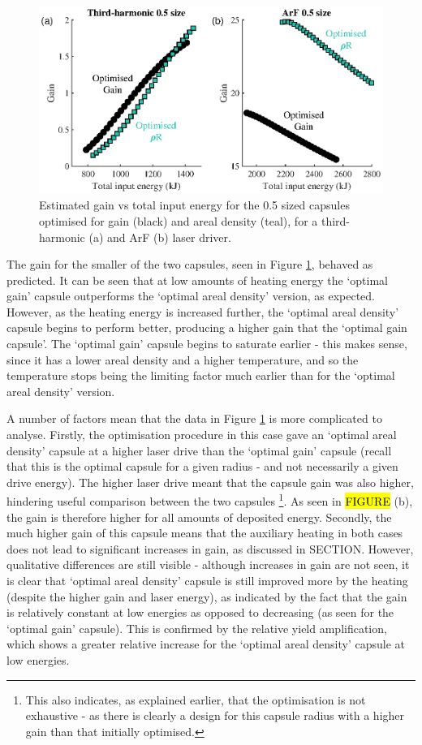 \begin{figure}[ht]
\centering
\includegraphics{figures/FurtherSims/OptimisedRhoR.eps}
\caption{Estimated gain vs total input energy for the 0.5 sized capsules optimised for gain (black) and areal density (teal), for a third-harmonic (a) and ArF (b) laser driver.}
\label{fig:OptimisedRhoR}
\end{figure}

The gain for the smaller of the two capsules, seen in Figure \ref{fig:OptimisedRhoR}, behaved as predicted. It can be seen that at low amounts of heating energy the `optimal gain' capsule outperforms the `optimal areal density' version, as expected. However, as the heating energy is increased further, the `optimal areal density' capsule begins to perform better, producing a higher gain that the `optimal gain capsule'. The `optimal gain' capsule begins to saturate earlier - this makes sense, since it has a lower areal density and a higher temperature, and so the temperature stops being the limiting factor much earlier than for the `optimal areal density' version.

A number of factors mean that the data in Figure \ref{fig:OptimisedRhoR} is more complicated to analyse. Firstly, the optimisation procedure in this case gave an `optimal areal density' capsule at a higher laser drive than the `optimal gain' capsule (recall that this is the optimal capsule for a given radius - and not necessarily a given drive energy). The higher laser drive meant that the capsule gain was also higher, hindering useful comparison between the two capsules \footnote{This also indicates, as explained earlier, that the optimisation is not exhaustive - as there is clearly a design for this capsule radius with a higher gain than that initially optimised.}. As seen in \hl{FIGURE} (b), the gain is therefore higher for all amounts of deposited energy. Secondly, the much higher gain of this capsule means that the auxiliary heating in both cases does not lead to significant increases in gain, as discussed in SECTION. However, qualitative differences are still visible - although increases in gain are not seen, it is clear that `optimal areal density' capsule is still improved more by the heating (despite the higher gain and laser energy), as indicated by the fact that the gain is relatively constant at low energies as opposed to decreasing (as seen for the `optimal gain' capsule). This is confirmed by the relative yield amplification, which shows a greater relative increase for the `optimal areal density' capsule at low energies.

